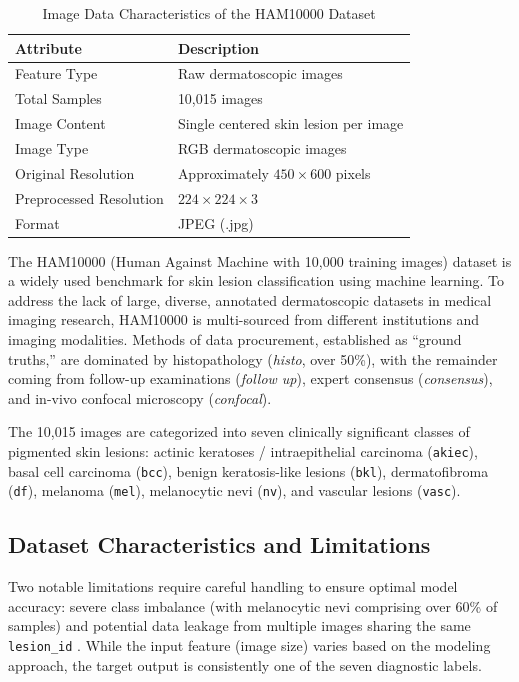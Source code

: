\documentclass[conference]{IEEEtran}
\begin{document}
\begin{table}[h]
\centering
\caption{Image Data Characteristics of the HAM10000 Dataset}
\begin{tabular}{ll}
\hline
\textbf{Attribute} & \textbf{Description} \\ \hline
Feature Type & Raw dermatoscopic images \\
Total Samples & 10,015 images \\
Image Content & Single centered skin lesion per image \\
Image Type & RGB dermatoscopic images \\
Original Resolution & Approximately $450 \times 600$ pixels \\
Preprocessed Resolution & $224 \times 224 \times 3$ \\
Format & JPEG (.jpg) \\
\hline
\end{tabular}
\end{table}

The HAM10000 (Human Against Machine with 10{,}000 training images)
dataset \cite{tschandl2018} is a widely used benchmark for skin
lesion classification using machine learning. To address the lack
of large, diverse, annotated dermatoscopic datasets in medical
imaging research, HAM10000 is multi-sourced from different
institutions and imaging modalities. Methods of data procurement,
established as ``ground truths,'' are dominated by histopathology
(\textit{histo}, over 50\%), with the remainder coming from follow-up
examinations (\textit{follow up}), expert consensus
(\textit{consensus}), and in-vivo confocal microscopy
(\textit{confocal}).

The 10{,}015 images are categorized into seven clinically significant
classes of pigmented skin lesions: actinic keratoses /
intraepithelial carcinoma (\texttt{akiec}), basal cell carcinoma
(\texttt{bcc}), benign keratosis-like lesions (\texttt{bkl}),
dermatofibroma (\texttt{df}), melanoma (\texttt{mel}), melanocytic
nevi (\texttt{nv}), and vascular lesions (\texttt{vasc}).

\subsection{Dataset Characteristics and Limitations}
Two notable limitations require careful handling to ensure optimal
model accuracy: severe class imbalance (with melanocytic nevi
comprising over 60\% of samples) and potential data leakage from
multiple images sharing the same \texttt{lesion\_id}
\cite{tschandl2018,b3,kaggle2018}. While the input feature (image
size) varies based on the modeling approach, the target output is
consistently one of the seven diagnostic labels.
\end{document}
